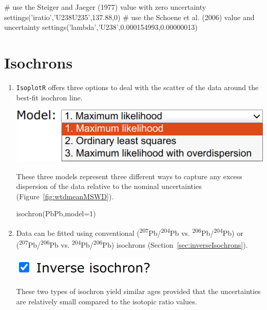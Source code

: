 \begin{refsection}
\begin{script}
# use the Steiger and Jaeger (1977) value with zero uncertainty
settings('iratio','U238U235',137.88,0)
# use the Schoene et al. (2006) value and uncertainty
settings('lambda','U238',0.000154993,0.00000013) 
\end{script}

\section{Isochrons}

\begin{enumerate}

\item \texttt{IsoplotR} offers three options to deal with the scatter of the
  data around the best-fit isochron line.

\noindent\begin{minipage}[t]{.45\linewidth}
\strut\vspace*{-\baselineskip}\newline
\includegraphics[width=\linewidth]{../figures/PbPbIsochronModels.png}
\end{minipage}
\begin{minipage}[t]{.55\linewidth}
  These three models represent three different ways to capture any
  excess dispersion of the data relative to the nominal uncertainties
  (Figure~\ref{fig:wtdmeanMSWD}).
\end{minipage}

\begin{console}
isochron(PbPb,model=1)
\end{console}

\item Data can be fitted using conventional
  (\textsuperscript{207}Pb/\textsuperscript{204}Pb
  vs. \textsuperscript{206}Pb/\textsuperscript{204}Pb) or
  (\textsuperscript{207}Pb/\textsuperscript{206}Pb
  vs. \textsuperscript{204}Pb/\textsuperscript{206}Pb) isochrons
  (Section~\ref{sec:inverseIsochrons}).

  \noindent\begin{minipage}[t]{.22\linewidth}
\strut\vspace*{-\baselineskip}\newline
\includegraphics[width=\linewidth]{../figures/PbPbisochronInverse.png}
\end{minipage}
\begin{minipage}[t]{.78\linewidth}
  These two types of isochron yield similar ages provided that the
  uncertainties are relatively small compared to the isotopic ratio
  values.
\end{minipage}


\end{enumerate}
\end{refsection}
